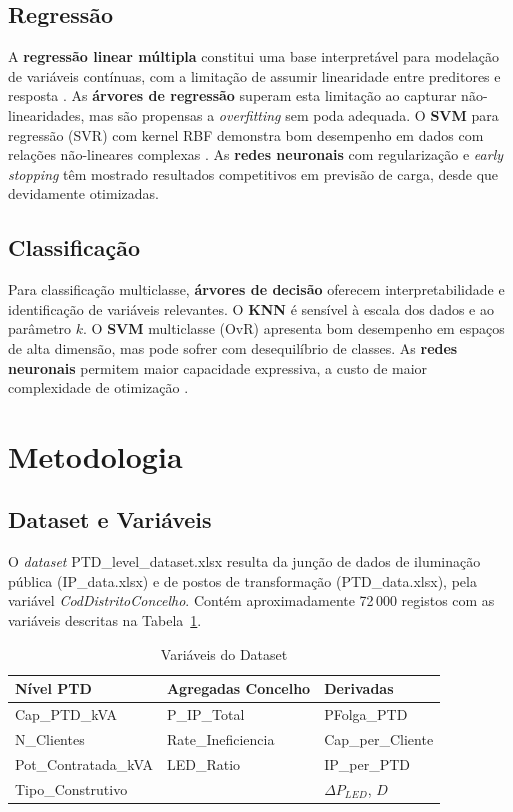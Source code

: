 \documentclass[conference]{IEEEtran}
\begin{document}
\subsection{Regressão}
A \textbf{regressão linear múltipla} constitui uma base interpretável para modelação de variáveis contínuas, com a limitação de assumir linearidade entre preditores e resposta \cite{mitchell1997}. As \textbf{árvores de regressão} superam esta limitação ao capturar não-linearidades, mas são propensas a \textit{overfitting} sem poda adequada. O \textbf{SVM} para regressão (SVR) com kernel RBF demonstra bom desempenho em dados com relações não-lineares complexas \cite{bishop2006}. As \textbf{redes neuronais} com regularização e \textit{early stopping} têm mostrado resultados competitivos em previsão de carga, desde que devidamente otimizadas.

\subsection{Classificação}
Para classificação multiclasse, \textbf{árvores de decisão} oferecem interpretabilidade e identificação de variáveis relevantes. O \textbf{KNN} é sensível à escala dos dados e ao parâmetro $k$. O \textbf{SVM} multiclasse (OvR) apresenta bom desempenho em espaços de alta dimensão, mas pode sofrer com desequilíbrio de classes. As \textbf{redes neuronais} permitem maior capacidade expressiva, a custo de maior complexidade de otimização \cite{bishop2006}.

\section{Metodologia}

\subsection{Dataset e Variáveis}

O \textit{dataset} PTD\_level\_dataset.xlsx resulta da junção de dados de iluminação pública (IP\_data.xlsx) e de postos de transformação (PTD\_data.xlsx), pela variável \textit{CodDistritoConcelho}. Contém aproximadamente 72\,000 registos com as variáveis descritas na Tabela~\ref{tab:variaveis}.

\begin{table}[htbp]
\caption{Variáveis do Dataset}
\label{tab:variaveis}
\begin{center}
\begin{tabular}{lll}
\toprule
\textbf{Nível PTD} & \textbf{Agregadas Concelho} & \textbf{Derivadas} \\
\midrule
Cap\_PTD\_kVA & P\_IP\_Total & PFolga\_PTD \\
N\_Clientes & Rate\_Ineficiencia & Cap\_per\_Cliente \\
Pot\_Contratada\_kVA & LED\_Ratio & IP\_per\_PTD \\
Tipo\_Construtivo & & $\Delta P_{LED}$, $D$ \\
\bottomrule
\end{tabular}
\end{center}
\end{table}
\end{document}
